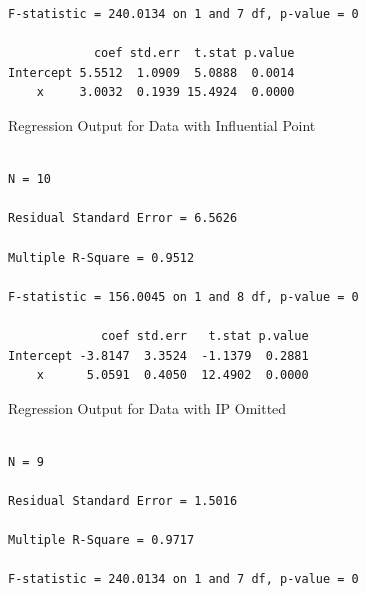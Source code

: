 {{{\begin{verbatim}
F-statistic = 240.0134 on 1 and 7 df, p-value = 0

            coef std.err  t.stat p.value 
Intercept 5.5512  1.0909  5.0888  0.0014
    x     3.0032  0.1939 15.4924  0.0000
\end{verbatim}
}
\begin{figure}
\end{figure}
\clearpage
\begin{center}
Regression Output for Data with Influential Point
\end{center}
{\large
\begin{verbatim}

N = 10

Residual Standard Error = 6.5626

Multiple R-Square = 0.9512

F-statistic = 156.0045 on 1 and 8 df, p-value = 0

             coef std.err   t.stat p.value 
Intercept -3.8147  3.3524  -1.1379  0.2881
    x      5.0591  0.4050  12.4902  0.0000
\end{verbatim}
}
\vspace{0.5in}
\begin{center}
Regression Output for Data with IP Omitted
\end{center}
{\large
\begin{verbatim}

N = 9

Residual Standard Error = 1.5016

Multiple R-Square = 0.9717

F-statistic = 240.0134 on 1 and 7 df, p-value = 0


\end{verbatim}}}}
